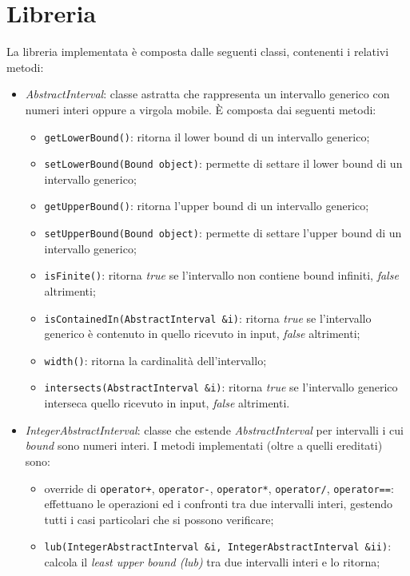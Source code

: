\documentclass[a4paper, 10pt]{report}
\begin{document}
\section*{Libreria}
La libreria implementata è composta dalle seguenti classi, contenenti i relativi metodi:
\begin{itemize}
	\item \textit{AbstractInterval}: classe astratta che rappresenta un intervallo generico con numeri interi oppure a virgola mobile. È composta dai seguenti metodi:
	\begin{itemize}
		\item \verb|getLowerBound()|: ritorna il lower bound di un intervallo generico;
		\item \verb|setLowerBound(Bound object)|: permette di settare il lower bound di un intervallo generico;
		\item \verb|getUpperBound()|: ritorna l'upper bound di un intervallo generico;
		\item \verb|setUpperBound(Bound object)|: permette di settare l'upper bound di un intervallo generico;
		\item \verb|isFinite()|: ritorna \textit{true} se l'intervallo non contiene bound infiniti, \textit{false} altrimenti;
		\item \verb|isContainedIn(AbstractInterval &i)|: ritorna \textit{true} se l'intervallo generico è contenuto in quello ricevuto in input, \textit{false} altrimenti;
		\item \verb|width()|: ritorna la cardinalità dell'intervallo;
		\item \verb|intersects(AbstractInterval &i)|: ritorna \textit{true} se l'intervallo generico interseca quello ricevuto in input, \textit{false} altrimenti.
	\end{itemize}
	\item \textit{IntegerAbstractInterval}: classe che estende \textit{AbstractInterval} per intervalli i cui \textit{bound} sono numeri interi. I metodi implementati (oltre a quelli ereditati) sono:
	\begin{itemize}
		\item override di \verb|operator+|, \verb|operator-|, \verb|operator*|, \verb|operator/|, \verb|operator==|: effettuano le operazioni ed i confronti tra due intervalli interi, gestendo tutti i casi particolari che si possono verificare;
		\item \verb|lub(IntegerAbstractInterval &i, IntegerAbstractInterval &ii)|: calcola il \textit{least upper bound (lub)} tra due intervalli interi e lo ritorna;

\end{itemize}
\end{itemize}
\end{document}
